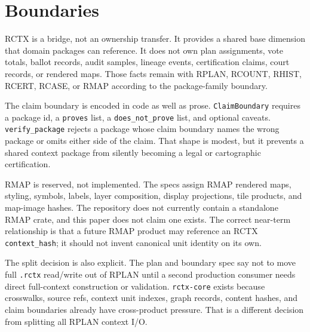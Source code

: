 \section{Boundaries}

RCTX is a bridge, not an ownership transfer. It provides a shared base
dimension that domain packages can reference. It does not own plan assignments,
vote totals, ballot records, audit samples, lineage events, certification
claims, court records, or rendered maps. Those facts remain with RPLAN, RCOUNT,
RHIST, RCERT, RCASE, or RMAP according to the package-family boundary.

The claim boundary is encoded in code as well as prose. \texttt{ClaimBoundary}
requires a package id, a \texttt{proves} list, a \texttt{does\_not\_prove}
list, and optional caveats. \texttt{verify\_package} rejects a package whose
claim boundary names the wrong package or omits either side of the claim. That
shape is modest, but it prevents a shared context package from silently
becoming a legal or cartographic certification.

RMAP is reserved, not implemented. The specs assign RMAP rendered maps,
styling, symbols, labels, layer composition, display projections, tile
products, and map-image hashes. The repository does not currently contain a
standalone RMAP crate, and this paper does not claim one exists. The correct
near-term relationship is that a future RMAP product may reference an RCTX
\texttt{context\_hash}; it should not invent canonical unit identity on its own.

The split decision is also explicit. The plan and boundary spec say not to move
full \texttt{.rctx} read/write out of RPLAN until a second production consumer
needs direct full-context construction or validation. \texttt{rctx-core} exists
because crosswalks, source refs, context unit indexes, graph records, content
hashes, and claim boundaries already have cross-product pressure. That is a
different decision from splitting all RPLAN context I/O.
